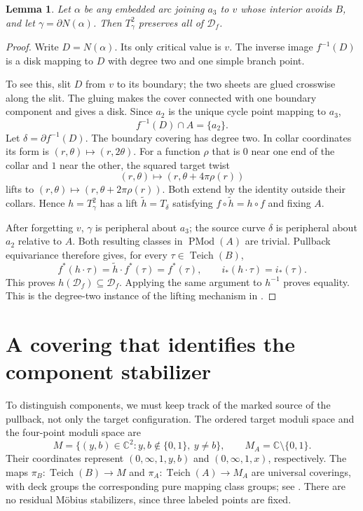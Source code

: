 \documentclass[11pt]{article}
\newcommand{\C}{\mathbb C}
\newcommand{\Teich}{\operatorname{Teich}}
\newcommand{\Mod}{\operatorname{PMod}}
\newcommand{\D}{\mathcal D}
\newtheorem{lemma}[theorem]{Lemma}
\theoremstyle{remark}
\begin{document}
\begin{lemma}\label{lem:preserve}
Let $\alpha$ be any embedded arc joining $a_3$ to $v$ whose interior avoids $B$, and let $\gamma=\partial N(\alpha)$. Then $T_\gamma^2$ preserves all of $\D_f$.
\end{lemma}
\begin{proof}
Write $D=N(\alpha)$. Its only critical value is $v$. The inverse image $f^{-1}(D)$ is a disk mapping to $D$ with degree two and one simple branch point. 

To see this, slit $D$ from $v$ to its boundary; the two sheets are glued crosswise along the slit. The gluing makes the cover connected with one boundary component and gives a disk. Since $a_2$ is the unique cycle point mapping to $a_3$,
\[
 f^{-1}(D)\cap A=\{a_2\}.
\]
Let $\delta=\partial f^{-1}(D)$. The boundary covering has degree two. In collar coordinates its form is $(r,\theta)\mapsto(r,2\theta)$. For a function $\rho$ that is $0$ near one end of the collar and $1$ near the other, the squared target twist
\[
 (r,\theta)\longmapsto(r,\theta+4\pi\rho(r))
\]
lifts to $(r,\theta)\mapsto(r,\theta+2\pi\rho(r))$. Both extend by the identity outside their collars. Hence $h=T_\gamma^2$ has a lift $\widetilde h=T_\delta$ satisfying $f\circ\widetilde h=h\circ f$ and fixing $A$.

After forgetting $v$, $\gamma$ is peripheral about $a_3$; the source curve $\delta$ is peripheral about $a_2$ relative to $A$. Both resulting classes in $\Mod(A)$ are trivial. Pullback equivariance therefore gives, for every $\tau\in\Teich(B)$,
\[
 f^*(h\cdot\tau)=\widetilde h\cdot f^*(\tau)=f^*(\tau),
 \qquad i_*(h\cdot\tau)=i_*(\tau).
\]
This proves $h(\D_f)\subseteq\D_f$. Applying the same argument to $h^{-1}$ proves equality. This is the degree-two instance of the lifting mechanism in \cite[Lemmas 5.3 and 5.5]{FKS}.
\end{proof}

\section{A covering that identifies the component stabilizer}
To distinguish components, we must keep track of the marked source of the pullback, not only the target configuration. The ordered target moduli space and the four-point moduli space are
\[
 M=\{(y,b)\in\C^2:y,b\notin\{0,1\},\ y\ne b\},\qquad
 M_A=\C\setminus\{0,1\}.
\]
Their coordinates represent $(0,\infty,1,y,b)$ and $(0,\infty,1,x)$, respectively. The maps $\pi_B:\Teich(B)\to M$ and $\pi_A:\Teich(A)\to M_A$ are universal coverings, with deck groups the corresponding pure mapping class groups; see \cite[Section 2.3]{HK}. There are no residual M\"obius stabilizers, since three labeled points are fixed.
\end{document}
